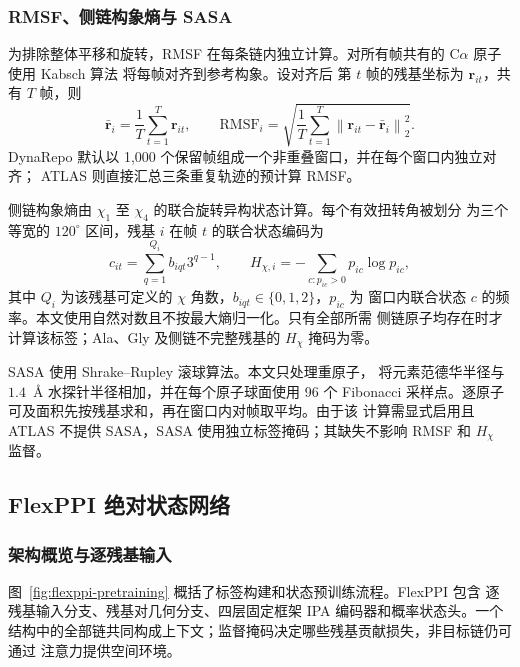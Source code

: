 \subsubsection{RMSF、侧链构象熵与 SASA}

为排除整体平移和旋转，RMSF 在每条链内独立计算。对所有帧共有的 C$\alpha$
原子使用 Kabsch 算法\cite{kabsch1976solution} 将每帧对齐到参考构象。设对齐后
第 $t$ 帧的残基坐标为 $\mathbf r_{it}$，共有 $T$ 帧，则
\begin{equation}
    \bar{\mathbf r}_i=\frac{1}{T}\sum_{t=1}^{T}\mathbf r_{it},\qquad
    \mathrm{RMSF}_i=
    \sqrt{\frac{1}{T}\sum_{t=1}^{T}
    \left\|\mathbf r_{it}-\bar{\mathbf r}_i\right\|_2^2}.
    \label{eq:rmsf}
\end{equation}
DynaRepo 默认以 1,000 个保留帧组成一个非重叠窗口，并在每个窗口内独立对齐；
ATLAS 则直接汇总三条重复轨迹的预计算 RMSF。

侧链构象熵由 $\chi_1$ 至 $\chi_4$ 的联合旋转异构状态计算。每个有效扭转角被划分
为三个等宽的 $120^\circ$ 区间，残基 $i$ 在帧 $t$ 的联合状态编码为
\begin{equation}
    c_{it}=\sum_{q=1}^{Q_i}b_{iqt}3^{q-1},
    \qquad
    H_{\chi,i}=-\sum_{c:p_{ic}>0}p_{ic}\log p_{ic},
    \label{eq:chi-entropy}
\end{equation}
其中 $Q_i$ 为该残基可定义的 $\chi$ 角数，$b_{iqt}\in\{0,1,2\}$，$p_{ic}$ 为
窗口内联合状态 $c$ 的频率。本文使用自然对数且不按最大熵归一化。只有全部所需
侧链原子均存在时才计算该标签；Ala、Gly 及侧链不完整残基的 $H_\chi$ 掩码为零。

SASA 使用 Shrake--Rupley 滚球算法\cite{shrake1973environment}。本文只处理重原子，
将元素范德华半径与 $1.4$~\AA{} 水探针半径相加，并在每个原子球面使用 96 个
Fibonacci 采样点。逐原子可及面积先按残基求和，再在窗口内对帧取平均。由于该
计算需显式启用且 ATLAS 不提供 SASA，SASA 使用独立标签掩码；其缺失不影响 RMSF
和 $H_\chi$ 监督。

\subsection{FlexPPI 绝对状态网络}

\subsubsection{架构概览与逐残基输入}

图~\ref{fig:flexppi-pretraining} 概括了标签构建和状态预训练流程。FlexPPI 包含
逐残基输入分支、残基对几何分支、四层固定框架 IPA 编码器和概率状态头。一个
结构中的全部链共同构成上下文；监督掩码决定哪些残基贡献损失，非目标链仍可通过
注意力提供空间环境。

